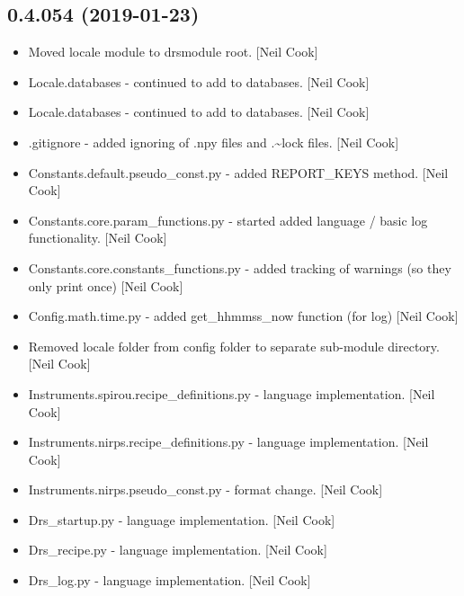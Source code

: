 \documentclass[a4paper,10pt,english]{report}
\begin{document}
\subsection{0.4.054 (2019-01-23)}
\label{\detokenize{misc/changelog:id208}}\begin{itemize}
\item {} 
Moved locale module to drsmodule root. {[}Neil Cook{]}

\item {} 
Locale.databases - continued to add to databases. {[}Neil Cook{]}

\item {} 
Locale.databases - continued to add to databases. {[}Neil Cook{]}

\item {} 
.gitignore - added ignoring of .npy files and .\textasciitilde{}lock files. {[}Neil
Cook{]}

\item {} 
Constants.default.pseudo\_const.py - added REPORT\_KEYS method. {[}Neil
Cook{]}

\item {} 
Constants.core.param\_functions.py - started added language / basic log
functionality. {[}Neil Cook{]}

\item {} 
Constants.core.constants\_functions.py - added tracking of warnings (so
they only print once) {[}Neil Cook{]}

\item {} 
Config.math.time.py - added get\_hhmmss\_now function (for log) {[}Neil
Cook{]}

\item {} 
Removed locale folder from config folder to separate sub-module
directory. {[}Neil Cook{]}

\item {} 
Instruments.spirou.recipe\_definitions.py - language implementation.
{[}Neil Cook{]}

\item {} 
Instruments.nirps.recipe\_definitions.py - language implementation.
{[}Neil Cook{]}

\item {} 
Instruments.nirps.pseudo\_const.py - format change. {[}Neil Cook{]}

\item {} 
Drs\_startup.py - language implementation. {[}Neil Cook{]}

\item {} 
Drs\_recipe.py - language implementation. {[}Neil Cook{]}

\item {} 
Drs\_log.py - language implementation. {[}Neil Cook{]}

\end{itemize}
\end{document}
